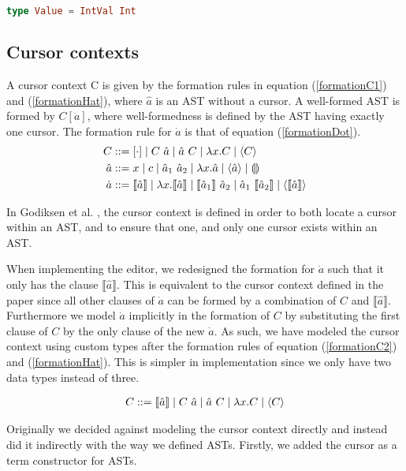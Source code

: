 \begin{lstlisting}[language=elm,%
                   gobble=0,%
                   ]
type Value = IntVal Int
\end{lstlisting}

\subsection{Cursor contexts}

A cursor context C is given by the formation rules in equation
(\ref{formationC1}) and (\ref{formationHat}), where $\hat{a}$ is an AST without
a cursor. A well-formed AST is formed by $C[\dot{a}]$, where well-formedness is
defined by the AST having exactly one cursor. The formation rule for $\dot{a}$
is that of equation (\ref{formationDot}).
\begin{align}
    C &::= [\cdot] \mid C~\hat{a} \mid \hat{a}~C \mid \lambda x.C \mid \langle C \rangle \label{formationC1}    \\
    \hat{a} &::= x \mid c \mid \hat{a}_1~\hat{a}_2 \mid \lambda x.\hat{a} \mid \langle \hat{a} \rangle \mid \llparenthesis\rrparenthesis\label{formationHat} \\
    \dot{a} &::= \llbracket \hat{a} \rrbracket \mid \lambda x.\llbracket \hat{a} \rrbracket \mid \llbracket \hat{a}_1 \rrbracket~\hat{a}_2 \mid \hat{a}_1~\llbracket \hat{a}_2 \rrbracket \mid \langle \llbracket \hat{a} \rrbracket \rangle\label{formationDot}
\end{align}

In Godiksen et al. \pepm, the cursor context is defined in order to both locate
a cursor within an AST, and to ensure that one, and only one cursor exists
within an AST.

When implementing the editor, we redesigned the formation for $\dot{a}$ such
that it only has the clause $\llbracket\hat{a}\rrbracket$. This is equivalent to
the cursor context defined in the paper since all other clauses of $\dot{a}$ can
be formed by a combination of $C$ and $\llbracket\hat{a}\rrbracket$. Furthermore
we model $\dot{a}$ implicitly in the formation of $C$ by substituting the first
clause of $C$ by the only clause of the new $\dot{a}$. As such, we have modeled
the cursor context using custom types after the formation rules of equation
(\ref{formationC2}) and (\ref{formationHat}). This is simpler in implementation
since we only have two data types instead of three.

\begin{align}\label{formationC2}
    C ::= \llbracket \hat{a} \rrbracket
    \mid C~\hat{a}
    \mid \hat{a}~C
    \mid \lambda x.C
    \mid \langle C \rangle
\end{align}

Originally we decided against modeling the cursor context directly and instead
did it indirectly with the way we defined ASTs. Firstly, we added the cursor as
a term constructor for ASTs.

